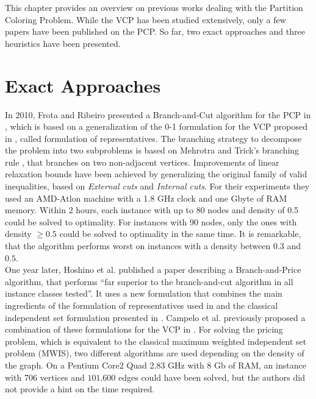 This chapter provides an overview on previous works dealing with the Partition Coloring Problem. While the VCP has been studied extensively, only a few papers have been published on the PCP. So far, two exact approaches and three heuristics have been presented.


\section{Exact Approaches}
In 2010, Frota and Ribeiro presented a Branch-and-Cut algorithm for the PCP in \cite{frota-07}, which is based on a generalization of the 0-1 formulation for the VCP proposed in \cite{campelo-05,campelo-04}, called formulation of representatives. The branching strategy to decompose the problem into two subproblems is based on Mehrotra and Trick's branching rule \cite{trick-96}, that branches on two non-adjacent vertices. Improvements of linear relaxation bounds have been achieved by generalizing the original family of valid inequalities\cite{campelo-05,campelo-04}, based on \textit{External cuts} and \textit{Internal cuts}. For their experiments they used an AMD-Atlon machine with a 1.8 GHz clock and one Gbyte of RAM memory. Within 2 hours, each instance with up to 80 nodes and density of 0.5 could be solved to optimality. For instances with 90 nodes, only the ones with density $\geq 0.5$ could be solved to optimality in the same time. It is remarkable, that the algorithm performs worst on instances with a density between $0.3$ and $0.5$.\\
One year later, Hoshino et al. published a paper describing a Branch-and-Price algorithm, that performs ``far superior to the branch-and-cut algorithm in all instance classes tested''\cite{hoshino-11}. It uses a new formulation that combines the main ingredients of the formulation of representatives used in \cite{frota-07} and the classical independent set formulation presented in \cite{trick-96}. Campelo et al. previously proposed a combination of these formulations for the VCP in \cite{campelo-052}. For solving the pricing problem, which is equivalent to the classical maximum weighted independent set problem (MWIS), two different algorithms are used depending on the density of the graph. On a Pentium Core2 Quad 2.83 GHz with 8 Gb of RAM, an instance with 706 vertices and $101.600$ edges could have been solved, but the authors did not provide a hint on the time required.


